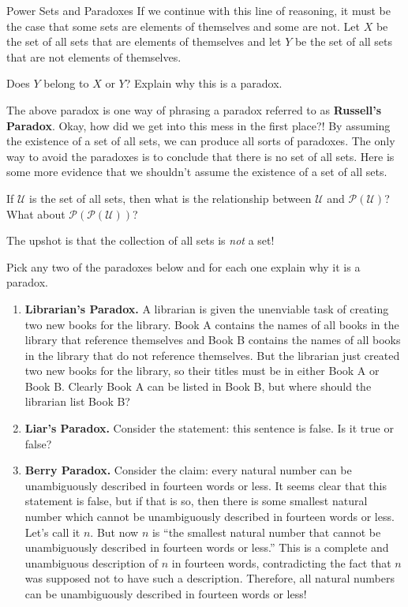 \begin{section}{Power Sets and Paradoxes}
If we continue with this line of reasoning, it must be the case that some sets are elements of themselves and some are not.  Let $X$ be the set of all sets that are elements of themselves and let $Y$ be the set of all sets that are not elements of themselves.

\begin{problem}
Does $Y$ belong to $X$ or $Y$?  Explain why this is a paradox.
\end{problem}

The above paradox is one way of phrasing a paradox referred to as \textbf{Russell's Paradox}.  Okay, how did we get into this mess in the first place?!  By assuming the existence of a set of all sets, we can produce all sorts of paradoxes.  The only way to avoid the paradoxes is to conclude that there is no set of all sets.  Here is some more evidence that we shouldn't assume the existence of a set of all sets.

\begin{problem}
If $\mathcal{U}$ is the set of all sets, then what is the relationship between $\mathcal{U}$ and $\mathcal{P}(\mathcal{U})$?  What about $\mathcal{P}(\mathcal{P}(\mathcal{U}))$?
\end{problem}

The upshot is that the collection of all sets is \emph{not} a set!  %

\begin{problem}
Pick any two of the paradoxes below and for each one explain why it is a paradox.
\begin{enumerate}[label=\textrm{(\alph*)}]
\item \textbf{Librarian's Paradox.} A librarian is given the unenviable task of creating two new books for the library. Book A contains the names of all books in the library that reference themselves and Book B contains the names of all books in the library that do not reference themselves. But the librarian just created two new books for the library, so their titles must be in either Book A or Book B. Clearly Book A can be listed in Book B, but where should the librarian list Book B?

\item \textbf{Liar's Paradox.} Consider the statement: this sentence is false. Is it true or false?

\item \textbf{Berry Paradox.} Consider the claim: every natural number can be unambiguously described in fourteen words or less. It seems clear that this statement is false, but if that is so, then there is some smallest natural number which cannot be unambiguously described in fourteen words or less. Let's call it $n$. But now $n$ is ``the smallest natural number that cannot be unambiguously described in fourteen words or less.'' This is a complete and unambiguous description of $n$ in fourteen words, contradicting the fact that $n$ was supposed not to have such a description. Therefore, all natural numbers can be unambiguously described in fourteen words or less!


\end{enumerate}
\end{problem}
\end{section}
